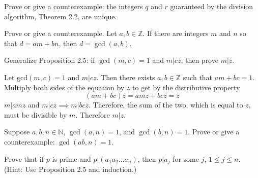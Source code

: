   \begin{exercise}[Shifrin 1.2.5]
    Prove or give a counterexample: the integers $q$ and $r$ guaranteed by the division algorithm, Theorem 2.2, are unique.
  \end{exercise}
  \begin{solution}
    
  \end{solution}

  \begin{exercise}[Shifrin 1.2.6]
     Prove or give a counterexample. Let $a, b \in \mathbb{Z}$. If there are integers $m$ and $n$ so that $d = am + bn$, then $d = \gcd(a, b)$.
  \end{exercise}
  \begin{solution}
    
  \end{solution}

  \begin{exercise}[Shifrin 1.2.7]
    Generalize Proposition 2.5: if $\gcd(m, c) = 1$ and $m|cz$, then prove $m|z$.
  \end{exercise}
  \begin{solution}
    Let $\mathrm{gcd}(m, c) = 1$ and $m | cz$. Then there exists $a, b \in \mathbb{Z}$ such that $am + bc = 1$. Multiply both sides of the equation by $z$ to get by the distributive property 
    \begin{equation}
      (am + bc) z = amz + bcz = z
    \end{equation} 
    $m | amz$ and $m | cz \implies m | bcz$. Therefore, the sum of the two, which is equal to $z$, must be divisible by $m$. Therefore $m | z$. 
  \end{solution}

  \begin{exercise}[Shifrin 1.2.8]
    Suppose $a, b, n \in \mathbb{N}$, $\gcd(a, n) = 1$, and $\gcd(b, n) = 1$. Prove or give a counterexample: $\gcd(ab, n) = 1$.
  \end{exercise}
  \begin{solution}
    
  \end{solution}

  \begin{exercise}[Shifrin 1.2.9]
    Prove that if $p$ is prime and $p|(a_1 a_2 \ldots a_n)$, then $p|a_j$ for some $j$, $1 \leq j \leq n$. (Hint: Use Proposition 2.5 and induction.)
  \end{exercise}
  \begin{solution}
    
  \end{solution}

